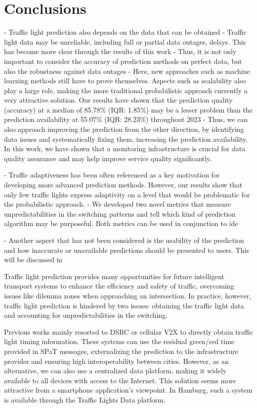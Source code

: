 \section{Conclusions}

- Traffic light prediction also depends on the data that can be obtained
- Traffic light data may be unreliable, including full or partial data outages, delays. This has become more clear through the results of this work
- Thus, it is not only important to consider the accuracy of prediction methods on perfect data, but also the robustness against data outages
- Here, new approaches such as machine learning methods still have to prove themselves. Aspects such as scalability also play a large role, making the more traditional probabilistic approach currently a very attractive solution. Our results have shown that the prediction quality (accuracy) at a median of 85.78\% (IQR: 1.85\%) may be a lesser problem than the prediction availability at 55.07\% (IQR: 28.23\%) throughout 2023
- Thus, we can also approach improving the prediction from the other direction, by identifying data issues and systematically fixing them, increasing the prediction availability. In this work, we have shown that a monitoring infrastructure is crucial for data quality assurance and may help improve service quality significantly.

- Traffic adaptiveness has been often referenced as a key motivation for developing more advanced prediction methods. However, our results show that only few traffic lights express adaptivity on a level that would be problematic for the probabilistic approach.
- We developed two novel metrics that measure unpredictabilities in the switching patterns and tell which kind of prediction algorithm may be purposeful. Both metrics can be used in conjunction to ide

- Another aspect that has not been considered is the usability of the prediction and how inaccurate or unavailable predictions should be presented to users. This will be discussed in 

Traffic light prediction provides many opportunities for future intelligent transport systems to enhance the efficiency and safety of traffic, overcoming issues like dilemma zones when approaching an intersection. In practice, however, traffic light prediction is hindered by two issues: obtaining the traffic light data and accounting for unpredictabilities in the switching. 

Previous works mainly resorted to DSRC or cellular V2X to directly obtain traffic light timing information. These systems can use the residual green/red time provided in SPaT messages, externalizing the prediction to the infrastructure provider and ensuring high interoperability between cities. However, as an alternative, we can also use a centralized data platform, making it widely available to all devices with access to the Internet. This solution seems more attractive from a smartphone application's viewpoint. In Hamburg, such a system is available through the Traffic Lights Data platform.


